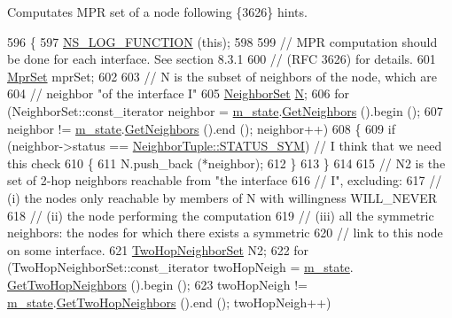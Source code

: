 Computates M\+PR set of a node following \{3626\} hints. 


\begin{DoxyCode}
596 \{
597   \hyperlink{log-macros-disabled_8h_a90b90d5bad1f39cb1b64923ea94c0761}{NS\_LOG\_FUNCTION} (\textcolor{keyword}{this});
598 
599   \textcolor{comment}{// MPR computation should be done for each interface. See section 8.3.1}
600   \textcolor{comment}{// (RFC 3626) for details.}
601   \hyperlink{namespacens3_1_1olsr_aa7c4ede0ba85f0ea9da6e6699525bd4a}{MprSet} mprSet;
602 
603   \textcolor{comment}{// N is the subset of neighbors of the node, which are}
604   \textcolor{comment}{// neighbor "of the interface I"}
605   \hyperlink{namespacens3_1_1olsr_af0afef1f28c6f0a0b528b03b638df05d}{NeighborSet} \hyperlink{loss__ITU1238_8m_aaa6c78b1d659f53598dbe891c1139b3e}{N};
606   \textcolor{keywordflow}{for} (NeighborSet::const\_iterator neighbor = \hyperlink{classns3_1_1olsr_1_1RoutingProtocol_a07942ec1a7df71b609c8d2ff3b567c49}{m\_state}.\hyperlink{classns3_1_1olsr_1_1OlsrState_a82d5882ca3fdb93a9c1110c6f176c03c}{GetNeighbors} ().begin ();
607        neighbor != \hyperlink{classns3_1_1olsr_1_1RoutingProtocol_a07942ec1a7df71b609c8d2ff3b567c49}{m\_state}.\hyperlink{classns3_1_1olsr_1_1OlsrState_a82d5882ca3fdb93a9c1110c6f176c03c}{GetNeighbors} ().end (); neighbor++)
608     \{
609       \textcolor{keywordflow}{if} (neighbor->status == \hyperlink{structns3_1_1olsr_1_1NeighborTuple_ad4b623edaedb3a5244291c738ce87e12a1649b9e4d61ac6e27eff65e8bd5dfe15}{NeighborTuple::STATUS\_SYM}) \textcolor{comment}{// I think that we need
       this check}
610         \{
611           N.push\_back (*neighbor);
612         \}
613     \}
614 
615   \textcolor{comment}{// N2 is the set of 2-hop neighbors reachable from "the interface}
616   \textcolor{comment}{// I", excluding:}
617   \textcolor{comment}{// (i)   the nodes only reachable by members of N with willingness WILL\_NEVER}
618   \textcolor{comment}{// (ii)  the node performing the computation}
619   \textcolor{comment}{// (iii) all the symmetric neighbors: the nodes for which there exists a symmetric}
620   \textcolor{comment}{//       link to this node on some interface.}
621   \hyperlink{namespacens3_1_1olsr_a5f9963792af7fea4dc66fb8718394604}{TwoHopNeighborSet} N2;
622   \textcolor{keywordflow}{for} (TwoHopNeighborSet::const\_iterator twoHopNeigh = \hyperlink{classns3_1_1olsr_1_1RoutingProtocol_a07942ec1a7df71b609c8d2ff3b567c49}{m\_state}.
      \hyperlink{classns3_1_1olsr_1_1OlsrState_ab03738874d0d785b770beef6dc9c2e1a}{GetTwoHopNeighbors} ().begin ();
623        twoHopNeigh != \hyperlink{classns3_1_1olsr_1_1RoutingProtocol_a07942ec1a7df71b609c8d2ff3b567c49}{m\_state}.\hyperlink{classns3_1_1olsr_1_1OlsrState_ab03738874d0d785b770beef6dc9c2e1a}{GetTwoHopNeighbors} ().end (); twoHopNeigh++)

\end{DoxyCode}
